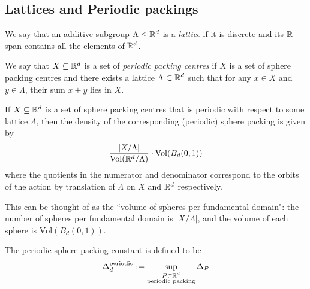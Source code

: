 \subsection{Lattices and Periodic packings}

\begin{definition}\label{EuclideanLattice.isLattice}\leanok
  We say that an additive subgroup $\Lambda \leq \mathbb{R}^d$ is a \emph{lattice} if it is discrete and its $\mathbb{R}$-span contains all the elements of $\mathbb{R}^d$.
\end{definition}


\begin{definition}\label{SpherePacking.PeriodicPackingCentres}\leanok
  We say that $X \subseteq \mathbb{R}^d$ is a set of \emph{periodic packing centres} if $X$ is a set of sphere packing centres and there exists a lattice $\Lambda \subset \mathbb{R}^d$ such that for any $x \in X$ and $y \in \Lambda$, their sum $x + y$ lies in $X$.
\end{definition}

\begin{lemma}\label{SpherePacking.Density of periodic packing}\notready
  If $X \subseteq \mathbb{R}^d$ is a set of sphere packing centres that is periodic with respect to some lattice $\Lambda$, then the density of the corresponding (periodic) sphere packing is given by
  $$ \frac{\lvert {X/\Lambda} \rvert}{\mathrm{Vol}(\mathbb{R}^d / \Lambda)} \cdot \mathrm{Vol}(B_d(0,1))$$
  where the quotients in the numerator and denominator correspond to the orbits of the action by translation of $\Lambda$ on $X$ and $\mathbb{R}^d$ respectively.
\end{lemma}
\begin{remark}
  This can be thought of as the ``volume of spheres per fundamental domain": the number of spheres per fundamental domain is $\lvert {X/\Lambda} \rvert$, and the volume of each sphere is $\mathrm{Vol}(B_d(0,1))$.
\end{remark}

\begin{definition}\label{def-Periodic-sphere-packing-constant}\notready
    The periodic sphere packing constant is defined to be
    $$ \Delta_{d}^{\text{periodic}} := \sup_{\substack{P \subset \mathbb{R}^d \\ \text{periodic packing}}} \Delta_P$$
\end{definition}

